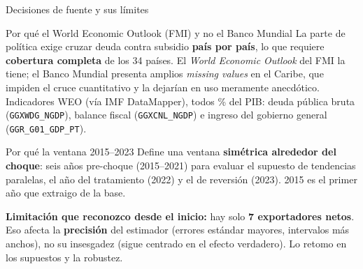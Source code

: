 \documentclass[aspectratio=169,10pt]{beamer}
\newcommand{\key}[1]{{\bfseries\color{AcentoRojo}#1}}
\begin{document}
\begin{frame}{Decisiones de fuente y sus límites}
  \small
  \begin{block}{Por qué el World Economic Outlook (FMI) y no el Banco Mundial}
    La parte de política exige cruzar deuda contra subsidio \textbf{país por país}, lo que requiere
    \textbf{cobertura completa} de los 34 países. El \emph{World Economic Outlook} del FMI la tiene;
    el Banco Mundial presenta \alert{amplios \emph{missing values} en el Caribe}, que impiden el
    cruce cuantitativo y la dejarían en uso meramente anecdótico.\\[0.3em]
    {\footnotesize Indicadores WEO (vía IMF DataMapper), todos \% del PIB: deuda pública bruta
    (\texttt{GGXWDG\_NGDP}), balance fiscal (\texttt{GGXCNL\_NGDP}) e ingreso del gobierno general
    (\texttt{GGR\_G01\_GDP\_PT}).}
  \end{block}

  \begin{block}{Por qué la ventana 2015--2023}
    Define una ventana \textbf{simétrica alrededor del choque}: seis años pre-choque (2015--2021)
    para evaluar el supuesto de tendencias paralelas, el año del tratamiento (2022) y el de
    reversión (2023). 2015 es el primer año que extraigo de la base.
  \end{block}

  \textbf{Limitación que reconozco desde el inicio:} hay solo \key{7 exportadores netos}. Eso afecta
  la \textbf{precisión} del estimador (errores estándar mayores, intervalos más anchos), \alert{no su
  insesgadez} (sigue centrado en el efecto verdadero). Lo retomo en los supuestos y la robustez.

\end{frame}
\end{document}
